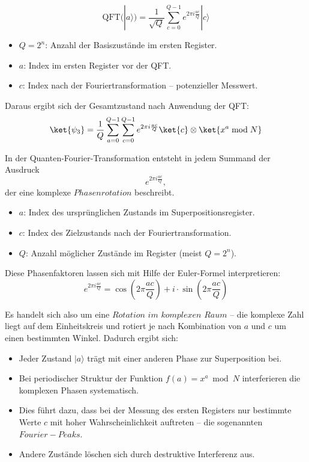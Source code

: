 \begin{enumerate}
\[
\mathrm{QFT}(|a\rangle) = \frac{1}{\sqrt{Q}} \sum_{c=0}^{Q-1} e^{2\pi i \frac{a c}{Q}} |c\rangle
\]

\begin{itemize}
    \item \( Q = 2^n \): Anzahl der Basiszustände im ersten Register.
    \item \( a \): Index im ersten Register vor der QFT.
    \item \( c \): Index nach der Fouriertransformation – potenzieller Messwert.
\end{itemize}

\noindent Daraus ergibt sich der Gesamtzustand nach Anwendung der QFT:
\[
\ket{\psi_3} = \frac{1}{Q} \sum_{a=0}^{Q-1} \sum_{c=0}^{Q-1} e^{2\pi i \frac{a c}{Q}} \ket{c} \otimes \ket{x^a \bmod N}
\]

\noindent In der Quanten-Fourier-Transformation entsteht in jedem Summand der Ausdruck
\[
e^{2\pi i \frac{a c}{Q}},
\]
der eine komplexe \(Phasenrotation\) beschreibt.

\begin{itemize}
    \item \textbf{\( a \)}: Index des ursprünglichen Zustands im Superpositionsregister.
    \item \textbf{\( c \)}: Index des Zielzustands nach der Fouriertransformation.
    \item \textbf{\( Q \)}: Anzahl möglicher Zustände im Register (meist \( Q = 2^n \)).
\end{itemize}

\noindent Diese Phasenfaktoren lassen sich mit Hilfe der Euler-Formel interpretieren:
\[
e^{2\pi i \frac{a c}{Q}} = \cos\left(2\pi \frac{a c}{Q}\right) + i \cdot \sin\left(2\pi \frac{a c}{Q}\right)
\]

\noindent Es handelt sich also um eine \(Rotation\) \(im\) \(komplexen\) \(Raum\) – die komplexe Zahl liegt auf dem Einheitskreis und rotiert je nach Kombination von \( a \) und \( c \) um einen bestimmten Winkel. Dadurch ergibt sich:

\begin{itemize}
    \item Jeder Zustand \( |a\rangle \) trägt mit einer anderen Phase zur Superposition bei.
    \item Bei periodischer Struktur der Funktion \( f(a) = x^a \bmod N \) interferieren die komplexen Phasen systematisch.
    \item Dies führt dazu, dass bei der Messung des ersten Registers nur bestimmte Werte \( c \) mit hoher Wahrscheinlichkeit auftreten – die sogenannten \(Fourier-Peaks\).
    \item Andere Zustände löschen sich durch destruktive Interferenz aus.
\end{itemize}


\end{enumerate}
